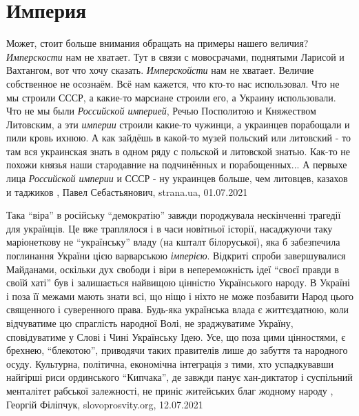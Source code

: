  
 
 
 
 
\chapter{Империя}
\label{sec:slova.imperia}

Может, стоит больше внимания обращать на примеры нашего величия?
\emph{Имперскости} нам не хватает. Тут в связи с мовосрачами, поднятыми
Ларисой и Вахтангом, вот что хочу сказать.  \emph{Имперскойсти} нам не хватает.
Величие собственное не осознаём. Всё нам кажется, что кто-то нас использовал.
Что не мы строили СССР, а какие-то марсиане строили его, а Украину
использовали. Что не мы были \emph{Российской империей}, Речью Посполитою и
Княжеством Литовским, а эти \emph{империи} строили какие-то чужинци, а
украинцев порабощали и пили кровь ихнюю.  А как зайдёшь в какой-то музей
польский или литовский - то там вся украинская знать в одном ряду с польской и
литовской знатью. Как-то не похожи князья наши стародавние на подчинённых и
порабощенных... А первыхе лица \emph{Российской империи} и СССР - ну украинцев
больше, чем литовцев, казахов и таджиков
, 
Павел Себастьянович, strana.ua, 01.07.2021

Така \enquote{віра} в російську \enquote{демократію} завжди породжувала нескінченні трагедії
для українців. Це вже траплялося і в часи новітньої історії, насаджуючи таку
маріонеткову не \enquote{українську} владу (на кшталт білоруської), яка б забезпечила
поглинання України цією варварською \emph{імперією}.  Відкриті спроби завершувалися
Майданами, оскільки дух свободи і віри в непереможність ідеї \enquote{своєї правди в
своїй хаті} був і залишається найвищою цінністю Українського народу. В Україні
і поза її межами мають знати всі, що ніщо і ніхто не може позбавити Народ цього
священного і суверенного права. Будь-яка українська влада є життєздатною, коли
відчуватиме цю спраглість народної Волі, не зраджуватиме Україну, сповідуватиме
у Слові і Чині Українську Ідею. Усе, що поза цими цінностями, є брехнею,
\enquote{блекотою}, приводячи таких правителів лише до забуття та народного осуду.
Культурна, політична, економічна інтеграція з тими, хто успадкувавши найгірші
риси ординського \enquote{Кипчака}, де завжди панує хан-диктатор і суспільний
менталітет рабської залежності, не приніс житейських благ жодному народу
, Георгій Філіпчук, slovoprosvity.org, 12.07.2021

